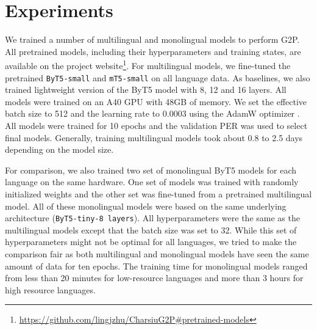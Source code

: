 \documentclass[a4paper]{article}
\begin{document}
\section{Experiments}
We trained a number of multilingual and monolingual models to perform G2P. All pretrained models, including their hyperparameters and training states, are available on the project website\footnote{\url{https://github.com/lingjzhu/CharsiuG2P\#pretrained-models}}. For multilingual models, we fine-tuned the pretrained \texttt{ByT5-small} and \texttt{mT5-small} on all language data. As baselines, we also trained lightweight version of the ByT5 model with 8, 12 and 16 layers. All models were trained on an A40 GPU with 48GB of memory. We set the effective batch size to 512 and the learning rate to $0.0003$ using the AdamW optimizer \cite{loshchilov2018decoupled}. All models were trained for 10 epochs and the validation PER was used to select final models. Generally, training multilingual models took about 0.8 to 2.5 days depending on the model size.

For comparison, we also trained two set of monolingual ByT5 models for each language on the same hardware. One set of models was trained with randomly initialized weights and the other set was fine-tuned from a pretrained multilingual model. All of these monolingual models were based on the same underlying architecture (\texttt{ByT5-tiny-8 layers}). All hyperparameters were the same as the multilingual models except that the batch size was set to 32. While this set of hyperparameters might not be optimal for all languages, we tried to make the comparison fair as both multilingual and monolingual models have seen the same amount of data for ten epochs. The training time for monolingual models ranged from less than 20 minutes for low-resource languages and more than 3 hours for high resource languages.
\end{document}
